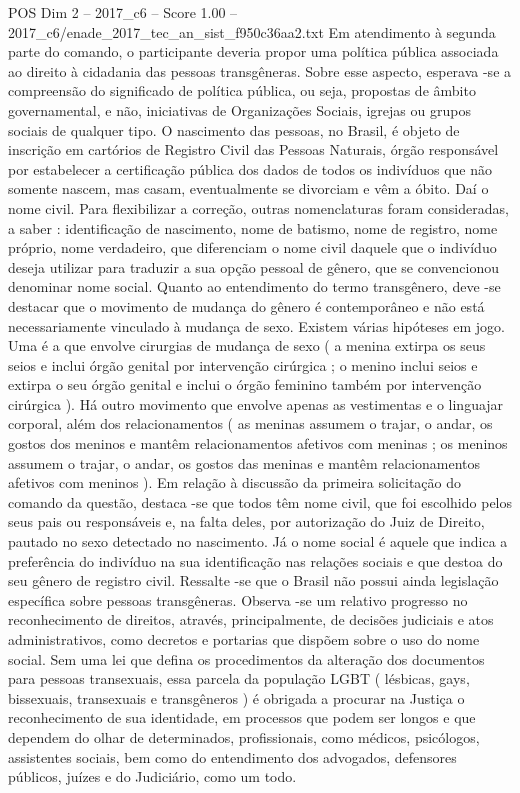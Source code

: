 \begin{textsample}{POS Dim 2 – 2017\_c6 – Score 1.00 – 2017\_c6/enade\_2017\_tec\_an\_sist\_f950c36aa2.txt}
Em atendimento à segunda parte do comando, o participante deveria propor uma política pública associada ao direito à cidadania das pessoas transgêneras.
Sobre esse aspecto, esperava -se a compreensão do significado de política pública, ou seja, propostas de âmbito governamental, e não, iniciativas de Organizações Sociais, igrejas ou grupos sociais de qualquer tipo.
O nascimento das pessoas, no Brasil, é objeto de inscrição em cartórios de Registro Civil das Pessoas Naturais, órgão responsável por estabelecer a certificação pública dos dados de todos os indivíduos que não somente nascem, mas casam, eventualmente se divorciam e vêm a óbito.
Daí o nome civil.
Para flexibilizar a correção, outras nomenclaturas foram consideradas, a saber : identificação de nascimento, nome de batismo, nome de registro, nome próprio, nome verdadeiro, que diferenciam o nome civil daquele que o indivíduo deseja utilizar para traduzir a sua opção pessoal de gênero, que se convencionou denominar nome social.
Quanto ao entendimento do termo transgênero, deve -se destacar que o movimento de mudança do gênero é contemporâneo e não está necessariamente vinculado à mudança de sexo.
Existem várias hipóteses em jogo.
Uma é a que envolve cirurgias de mudança de sexo ( a menina extirpa os seus seios e inclui órgão genital por intervenção cirúrgica ; o menino inclui seios e extirpa o seu órgão genital e inclui o órgão feminino também por intervenção cirúrgica ).
Há outro movimento que envolve apenas as vestimentas e o linguajar corporal, além dos relacionamentos ( as meninas assumem o trajar, o andar, os gostos dos meninos e mantêm relacionamentos afetivos com meninas ; os meninos assumem o trajar, o andar, os gostos das meninas e mantêm relacionamentos afetivos com meninos ).
Em relação à discussão da primeira solicitação do comando da questão, destaca -se que todos têm nome civil, que foi escolhido pelos seus pais ou responsáveis e, na falta deles, por autorização do Juiz de Direito, pautado no sexo detectado no nascimento.
Já o nome social é aquele que indica a preferência do indivíduo na sua identificação nas relações sociais e que destoa do seu gênero de registro civil.
Ressalte -se que o Brasil não possui ainda legislação específica sobre pessoas transgêneras.
Observa -se um relativo progresso no reconhecimento de direitos, através, principalmente, de decisões judiciais e atos administrativos, como decretos e portarias que dispõem sobre o uso do nome social.
Sem uma lei que defina os procedimentos da alteração dos documentos para pessoas transexuais, essa parcela da população LGBT ( lésbicas, gays, bissexuais, transexuais e transgêneros ) é obrigada a procurar na Justiça o reconhecimento de sua identidade, em processos que podem ser longos e que dependem do olhar de determinados, profissionais, como médicos, psicólogos, assistentes sociais, bem como do entendimento dos advogados, defensores públicos, juízes e do Judiciário, como um todo.

\end{textsample}
